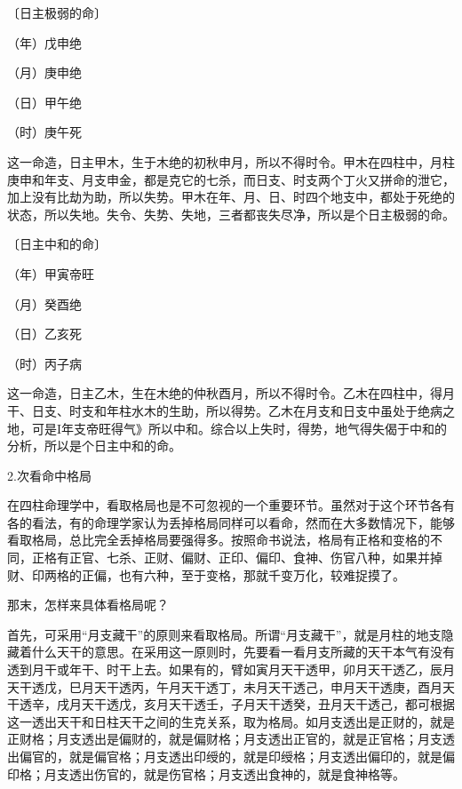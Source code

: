 \documentclass[a5paper,oneside,12pt]{ctexbook}
\begin{document}
〔日主极弱的命〕\par
（年）戊申{\scriptsize{绝}}\par
（月）庚申{\scriptsize{绝}}\par
（日）\quad{\scriptsize{\qquad{}}}甲午{\scriptsize{绝}}\par
（时）庚午{\scriptsize{死}}

这一命造，日主甲木，生于木绝的初秋申月，所以不得时令。甲木在四柱中，月柱庚申和年支、月支申金，都是克它的七杀，而日支、时支两个丁火又拼命的泄它，加上没有比劫为助，所以失势。甲木在年、月、日、时四个地支中，都处于死绝的状态，所以失地。失令、失势、失地，三者都丧失尽净，所以是个日主极弱的命。

〔日主中和的命〕\par
（年）甲寅{\scriptsize{帝旺}}\par
（月）癸酉{\scriptsize{绝}}\par
（日）\quad{\scriptsize{\qquad{}}}乙亥{\scriptsize{死}}\par
（时）丙子{\scriptsize{病}}\par

这一命造，日主乙木，生在木绝的仲秋酉月，所以不得时令。乙木在四柱中，得月干、日支、时支和年柱水木的生助，所以得势。乙木在月支和日支中虽处于绝病之地，可是I年支帝旺得气》所以中和。综合以上失时，得势，地气得失偈于中和的分析，所以是个日主中和的命。

2.次看命中格局

在四柱命理学中，看取格局也是不可忽视的一个重要环节。虽然对于这个环节各有各的看法，有的命理学家认为丢掉格局同样可以看命，然而在大多数情况下，能够看取格局，总比完全丢掉格局要强得多。按照命书说法，格局有正格和变格的不同，正格有正官、七杀、正财、偏财、正印、偏印、食神、伤官八种，如果并掉财、印两格的正偏，也有六种，至于变格，那就千变万化，较难捉摸了。

那末，怎样来具体看格局呢？

首先，可采用“月支藏干”的原则来看取格局。所谓“月支藏干”，就是月柱的地支隐藏着什么天干的意思。在采用这一原则时，先要看一看月支所藏的天干本气有没有透到月干或年干、时干上去。如果有的，臂如寅月天干透甲，卯月天干透乙，辰月天干透戊，巳月天干透丙，午月天干透丁，未月天干透己，申月天干透庚，酉月天干透辛，戌月天干透戊，亥月天干透壬，子月天干透癸，丑月天干透己，都可根据这一透出天干和日柱天干之间的生克关系，取为格局。如月支透出是正财的，就是正财格；月支透出是偏财的，就是偏财格；月支透出正官的，就是正官格；月支透出偏官的，就是偏官格；月支透出印绶的，就是印绶格；月支透出偏印的，就是偏印格；月支透出伤官的，就是伤官格；月支透出食神的，就是食神格等。
\end{document}

